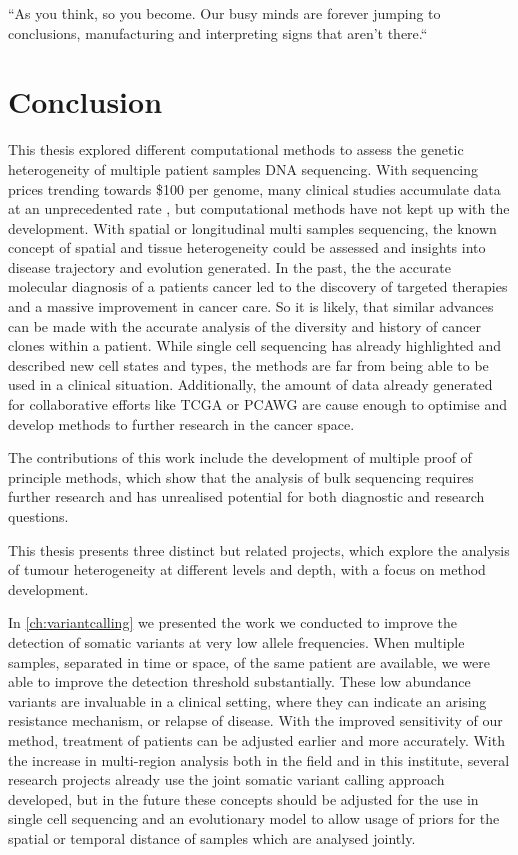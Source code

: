 
\begin{savequote}[85mm]
``As you think, so you become. Our busy minds are forever jumping to conclusions, manufacturing and interpreting signs that aren’t there.``
\end{savequote}


\chapter{Conclusion}
\label{ch:conclusion}

This thesis explored different computational methods to assess the genetic heterogeneity of multiple patient samples DNA sequencing. With sequencing prices trending towards \$100 per genome, many clinical studies accumulate data at an unprecedented rate \cite{Stephens2015}, but computational methods have not kept up with the development. With spatial or longitudinal multi samples sequencing, the known concept of spatial and tissue heterogeneity could be assessed and insights into disease trajectory and evolution generated. In the past, the the accurate molecular diagnosis of a patients cancer led to the discovery of targeted therapies and a massive improvement in cancer care. So it is likely, that similar advances can be made with the accurate analysis of the diversity and history of cancer clones within a patient. While single cell sequencing has already highlighted and described new cell states and types, the methods are far from being able to be used in a clinical situation. Additionally, the amount of data already generated for collaborative efforts like TCGA \cite{IPCAWGC2020} or PCAWG are cause enough to optimise and develop methods to further research in the cancer space.

The contributions of this work include the development of multiple proof of principle methods, which show that the analysis of bulk sequencing requires further research and has unrealised potential for both diagnostic and research questions.

This thesis presents three distinct but related projects, which explore the analysis of tumour heterogeneity at different levels and depth, with a focus on method development.

In \autoref{ch:variantcalling} we presented the work we conducted to improve the detection of somatic variants at very low allele frequencies. When multiple samples, separated in time or space, of the same patient are available, we were able to improve the detection threshold substantially. These low abundance variants are invaluable in a clinical setting, where they can indicate an arising resistance mechanism, or relapse of disease. With the improved sensitivity of our method, treatment of patients can be adjusted earlier and more accurately. With the increase in multi-region analysis both in the field and in this institute, several research projects already use the joint somatic variant calling approach developed, but in the future these concepts should be adjusted for the use in single cell sequencing and an evolutionary model to allow usage of priors for the spatial or temporal distance of samples which are analysed jointly.

